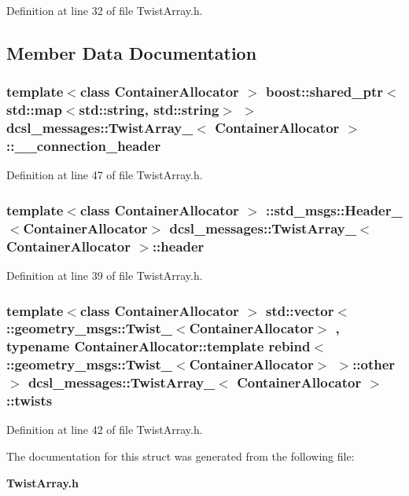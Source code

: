 \-Definition at line 32 of file \-Twist\-Array.\-h.



\subsection{\-Member \-Data \-Documentation}
\subsubsection[{\-\_\-\-\_\-connection\-\_\-header}]{\setlength{\rightskip}{0pt plus 5cm}template$<$class Container\-Allocator $>$ boost\-::shared\-\_\-ptr$<$std\-::map$<$std\-::string, std\-::string$>$ $>$ {\bf dcsl\-\_\-messages\-::\-Twist\-Array\-\_\-}$<$ \-Container\-Allocator $>$\-::{\bf \-\_\-\-\_\-connection\-\_\-header}}\label{structdcsl__messages_1_1TwistArray___a122056a2678f0bd440d0756502c5ebf6}


\-Definition at line 47 of file \-Twist\-Array.\-h.

\subsubsection[{header}]{\setlength{\rightskip}{0pt plus 5cm}template$<$class Container\-Allocator $>$ \-::std\-\_\-msgs\-::\-Header\-\_\-$<$\-Container\-Allocator$>$ {\bf dcsl\-\_\-messages\-::\-Twist\-Array\-\_\-}$<$ \-Container\-Allocator $>$\-::{\bf header}}\label{structdcsl__messages_1_1TwistArray___aa961118bfc76ae090f867ff6f97c46ca}


\-Definition at line 39 of file \-Twist\-Array.\-h.

\subsubsection[{twists}]{\setlength{\rightskip}{0pt plus 5cm}template$<$class Container\-Allocator $>$ std\-::vector$<$ \-::geometry\-\_\-msgs\-::\-Twist\-\_\-$<$\-Container\-Allocator$>$ , typename \-Container\-Allocator\-::template rebind$<$ \-::geometry\-\_\-msgs\-::\-Twist\-\_\-$<$\-Container\-Allocator$>$ $>$\-::other $>$ {\bf dcsl\-\_\-messages\-::\-Twist\-Array\-\_\-}$<$ \-Container\-Allocator $>$\-::{\bf twists}}\label{structdcsl__messages_1_1TwistArray___a59b7a4082beffe51b2e1bf3f178747a4}


\-Definition at line 42 of file \-Twist\-Array.\-h.



\-The documentation for this struct was generated from the following file\-:\begin{DoxyCompactItemize}
\item 
{\bf \-Twist\-Array.\-h}\end{DoxyCompactItemize}
